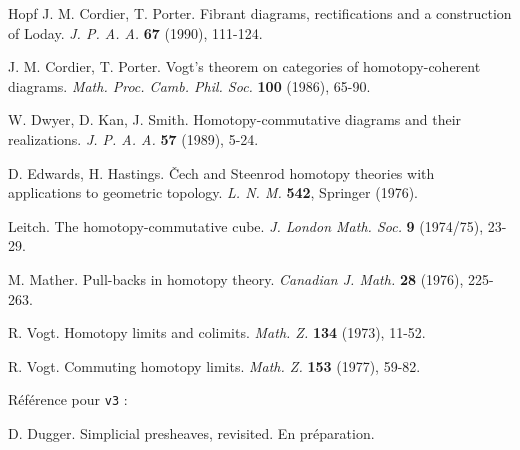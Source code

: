 \documentclass[12pt]{article}
\begin{document}
\begin{thebibliography}{Hopf}
J. M. Cordier, T. Porter. Fibrant diagrams, rectifications and a construction
of Loday. {\em J. P. A. A.} {\bf 67} (1990), 111-124.

J. M. Cordier, T. Porter. Vogt's theorem on categories of homotopy-coherent
diagrams. {\em Math. Proc. Camb. Phil. Soc.} {\bf 100} (1986), 65-90.

W. Dwyer, D. Kan, J. Smith. Homotopy-commutative diagrams and their
realizations. {\em J. P. A. A.} {\bf 57} (1989), 5-24.

D. Edwards, H. Hastings. \v{C}ech and Steenrod homotopy theories with
applications to geometric topology. {\em L. N. M.} {\bf 542},
Springer (1976).

Leitch. The homotopy-commutative cube. {\em J. London Math. Soc.}
{\bf 9} (1974/75), 23-29.

M. Mather. Pull-backs in homotopy theory. {\em Canadian J. Math.} {\bf 28}
(1976), 225-263.

R. Vogt. Homotopy limits and colimits. {\em Math. Z.} {\bf 134}
(1973), 11-52.

R. Vogt. Commuting homotopy limits. {\em Math. Z.} {\bf 153} (1977), 59-82.

R\'ef\'erence pour {\tt v3} :

D. Dugger. Simplicial presheaves, revisited. En pr\'eparation.


\end{thebibliography}
\end{document}
